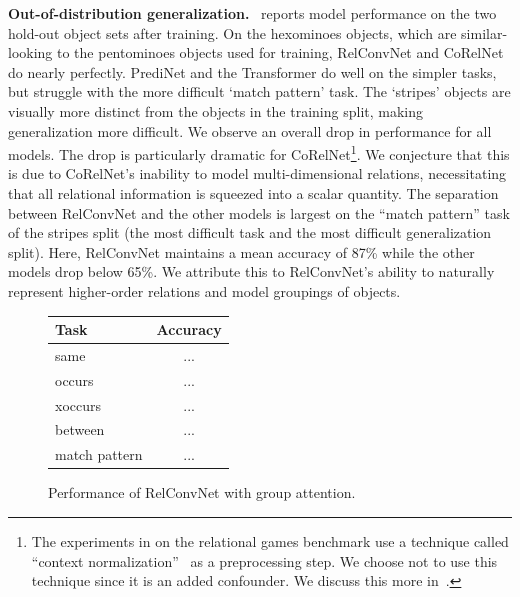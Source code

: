 \textbf{Out-of-distribution generalization.}~ reports model performance on the two hold-out object sets after training. On the hexominoes objects, which are similar-looking to the pentominoes objects used for training, RelConvNet and CoRelNet do nearly perfectly. PrediNet and the Transformer do well on the simpler tasks, but struggle with the more difficult `match pattern' task. The `stripes' objects are visually more distinct from the objects in the training split, making generalization more difficult. We observe an overall drop in performance for all models. The drop is particularly dramatic for CoRelNet\footnote{The experiments in \citep{kergNeuralArchitecture2022} on the relational games benchmark use a technique called ``context normalization''~\citep{webbLearningRepresentationsThat2020} as a preprocessing step. We choose not to use this technique since it is an added confounder. We discuss this more in~.}. We conjecture that this is due to CoRelNet's inability to model multi-dimensional relations, necessitating that all relational information is squeezed into a scalar quantity. The separation between RelConvNet and the other models is largest on the ``match pattern'' task of the stripes split (the most difficult task and the most difficult generalization split). Here, RelConvNet maintains a mean accuracy of 87\% while the other models drop below 65\%. We attribute this to RelConvNet's ability to naturally represent higher-order relations and model groupings of objects. 

\begin{figure}
    \begin{tabular}{lc}
        \toprule
        Task & Accuracy \\
        \midrule
        same & ...\\
        occurs & ... \\
        xoccurs & ...\\
        between & ... \\
        match pattern & ...\\
        \bottomrule
    \end{tabular}
    \caption{Performance of RelConvNet with group attention.}\label{tab:relgames_groupattn_resuls}
\end{figure}

